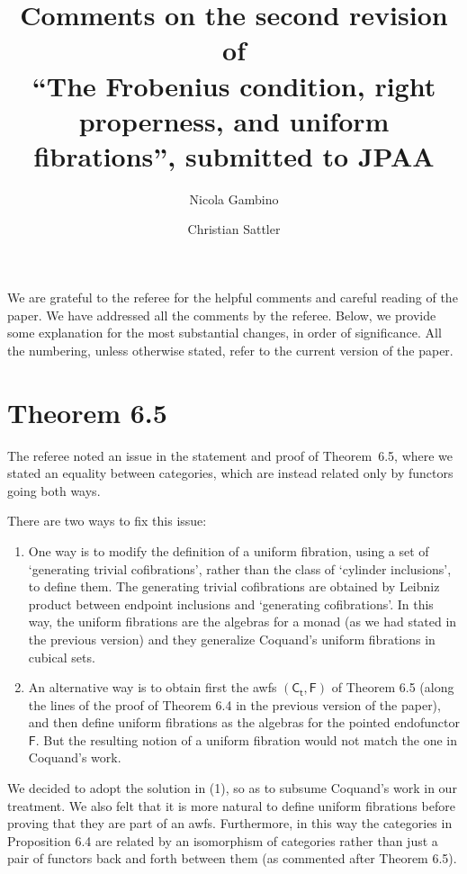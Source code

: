 \documentclass[reqno,10pt,a4paper,oneside,draft]{amsart}
\begin{document}
\title[Second revision]{Comments on the second revision of \\ ``The Frobenius condition, right properness, and uniform fibrations'', submitted to JPAA}

\author{Nicola Gambino \and Christian Sattler} 

\maketitle

We are grateful to the referee for the helpful comments and careful reading of the paper. We have addressed all the comments by the referee.  Below, we provide some explanation for the most substantial changes, in order of significance. All the numbering, unless otherwise stated, refer to the current version of the paper.


\section*{Theorem 6.5} 

The referee noted an issue in the statement and proof of Theorem~6.5, where we stated an equality between categories, which are
instead related only by functors going both ways.  

There are two ways to fix this issue: 

\begin{enumerate} 
\item One way is to modify the definition of a uniform fibration, using a set of `generating trivial cofibrations', rather than the class of `cylinder inclusions', to define them. The generating trivial cofibrations are obtained by Leibniz product between endpoint inclusions and `generating cofibrations'.  In this way, the uniform fibrations are the algebras for a monad (as we had stated in the previous version) and they generalize Coquand's uniform fibrations in cubical sets. 
\item  An alternative way is to obtain first the awfs $(\mathsf{C_t}, \mathsf{F})$ of Theorem 6.5 (along the lines of the proof of Theorem 6.4 in the previous version of the paper), and then define uniform fibrations as the algebras for the pointed endofunctor $\mathsf{F}$.
But the resulting notion of a uniform fibration would not match the one in Coquand's work.
\end{enumerate} 

We decided to adopt the solution in (1), so as to subsume Coquand's work in our treatment. We also felt that it is more natural
to define uniform fibrations before proving that they are part of an awfs. Furthermore, in this way the categories in Proposition 6.4
are related by  an isomorphism of categories rather than just a pair of functors back and forth between them (as commented after 
Theorem 6.5). 
\end{document}
